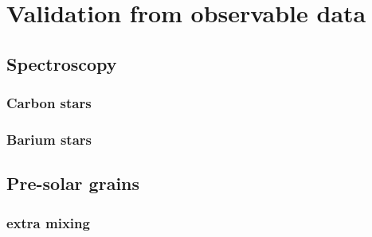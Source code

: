 \chapter{Validation from observable data}

\section{Spectroscopy}

\subsection{Carbon stars}

\subsection{Barium stars}

\section{Pre-solar grains}

\subsection{extra mixing}
